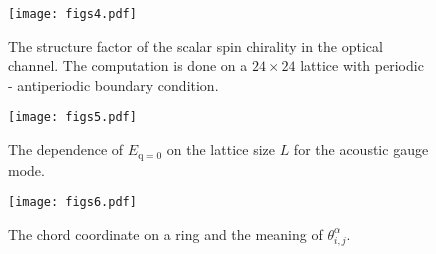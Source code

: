 \documentclass[12pt]{article}
\begin{document}
\begin{figure}[h!]
\texttt{[image: figs4.pdf]}
\caption{The structure factor of the scalar spin chirality in the optical channel. The computation is done on a $24\times 24$ lattice with periodic - antiperiodic boundary condition.}
\end{figure}

\begin{figure}[h!]
\texttt{[image: figs5.pdf]}
\caption{The dependence of $E_{\mathrm{q=0}}$ on the lattice size $L$ for the acoustic gauge mode.}
\end{figure}


\begin{figure}[h!]
\texttt{[image: figs6.pdf]}
\caption{The chord coordinate on a ring and the meaning of $\theta^{\alpha}_{i,j}$.}
\end{figure}
\end{document}

